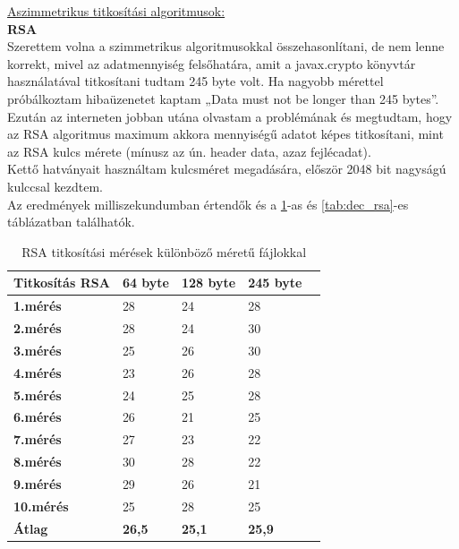 \vspace{25pt} \noindent \underline{Aszimmetrikus titkosítási algoritmusok:}
\vspace{15pt} \\ \textbf{RSA}
\vspace{5pt} \\ Szerettem volna a szimmetrikus algoritmusokkal összehasonlítani, de nem lenne korrekt, mivel az adatmennyiség felsőhatára, amit a javax.crypto könyvtár használatával titkosítani tudtam 245 byte volt. Ha nagyobb mérettel próbálkoztam hibaüzenetet kaptam „Data must not be longer than 245 bytes”.
\vspace{5pt} \\Ezután az interneten jobban utána olvastam a problémának és megtudtam, hogy az RSA algoritmus maximum akkora mennyiségű adatot képes titkosítani, mint az RSA kulcs mérete (mínusz az ún. header data, azaz fejlécadat). 
\vspace{5pt} \\Kettő hatványait használtam kulcsméret megadására, először 2048 bit nagyságú kulccsal kezdtem.
\\Az eredmények milliszekundumban értendők és a \ref{tab:enc_rsa}-as és \ref{tab:dec_rsa}-es táblázatban találhatók.

\begin{table}[H]
	\centering
	\caption{RSA titkosítási mérések különböző méretű fájlokkal}
	\label{tab:enc_rsa}
	\medskip
	\begin{tabular}{|p{2.4cm}|p{2cm}|p{2cm}|p{2cm}|p{2cm}|}
		\hline
		\textbf{Titkosítás} \newline \textbf{RSA} & \textbf{64 byte} & \textbf{128 byte} & \textbf{245 byte}\\
		\hline
		\textbf{1.mérés} & 28 & 24 & 28\\
		\hline
		\textbf{2.mérés} & 28 & 24 & 30\\
		\hline
		\textbf{3.mérés} & 25 & 26 & 30\\
		\hline
		\textbf{4.mérés} & 23 & 26 & 28\\
		\hline
		\textbf{5.mérés} & 24 & 25 & 28\\
		\hline
		\textbf{6.mérés} & 26 & 21 & 25\\
		\hline
		\textbf{7.mérés} & 27 & 23 & 22\\
		\hline
		\textbf{8.mérés} & 30 & 28 & 22\\
		\hline
		\textbf{9.mérés} & 29 & 26 & 21\\
		\hline
		\textbf{10.mérés} & 25 & 28 & 25\\
		\hline
		\hline
		\textbf{Átlag} & \textbf{26,5} & \textbf{25,1} & \textbf{25,9}\\
		\hline
	\end{tabular}
\end{table}

